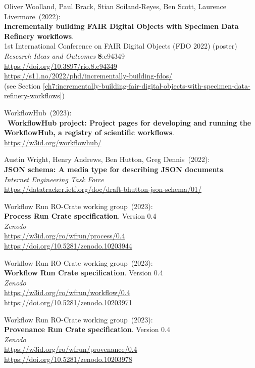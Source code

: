 \begin{thebibliography}{9}
Oliver Woolland, Paul Brack, Stian Soiland-Reyes, Ben Scott, Laurence Livermore~(2022): \\
\textbf{Incrementally building FAIR Digital Objects with Specimen Data Refinery workflows}.\\
1st International Conference on FAIR Digital Objects
(FDO 2022) (poster)\\
\emph{Research Ideas and Outcomes} \textbf{8}:e94349\\
\url{https://doi.org/10.3897/rio.8.e94349}\\
\url{https://s11.no/2022/phd/incrementally-building-fdos/}\\
(see Section \vref{ch7:incrementally-building-fair-digital-objects-with-specimen-data-refinery-workflows})

WorkflowHub~(2023): \\
~\textbf{WorkflowHub project: Project pages for developing and running the WorkflowHub, a registry of scientific workflows}.\\
\url{https://w3id.org/workflowhub/}

Austin Wright, Henry Andrews, Ben Hutton, Greg Dennis~(2022): \\
\textbf{JSON schema: A media type for describing JSON documents}.\\
\emph{Internet Engineering Task Force}\\
\url{https://datatracker.ietf.org/doc/draft-bhutton-json-schema/01/}

Workflow Run RO-Crate working group~(2023): \\
\textbf{Process Run Crate specification}. Version 0.4\\
\emph{Zenodo}\\
\url{https://w3id.org/ro/wfrun/process/0.4}\\
\url{https://doi.org/10.5281/zenodo.10203944}

Workflow Run RO-Crate working group~(2023): \\
\textbf{Workflow Run Crate specification}. Version 0.4\\
\emph{Zenodo}\\
\url{https://w3id.org/ro/wfrun/workflow/0.4}\\
\url{https://doi.org/10.5281/zenodo.10203971}

Workflow Run RO-Crate working group~(2023): \\
\textbf{Provenance Run Crate specification}. Version 0.4\\
\emph{Zenodo}\\
\url{https://w3id.org/ro/wfrun/provenance/0.4}\\
\url{https://doi.org/10.5281/zenodo.10203978}


\end{thebibliography}
